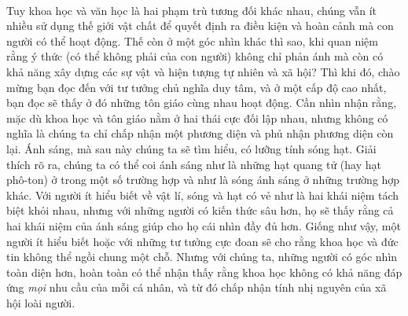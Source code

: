 \

Tuy khoa học và văn học là hai phạm trù tương đối khác nhau, chúng vẫn ít nhiều sử dụng thế giới vật chất để quyết định ra điều kiện và hoàn cảnh mà con người có thể hoạt động. Thế còn ở một góc nhìn khác thì sao, khi quan niệm rằng ý thức (có thể không phải của con người) không chỉ phản ánh mà còn có khả năng xây dựng các sự vật và hiện tượng tự nhiên và xã hội? Thì khi đó, chào mừng bạn đọc đến với tư tưởng chủ nghĩa duy tâm, và ở một cấp độ cao nhất, bạn đọc sẽ thấy ở đó những tôn giáo cùng nhau hoạt động. Cần nhìn nhận rằng, mặc dù khoa học và tôn giáo nằm ở hai thái cực đối lập nhau, nhưng không có nghĩa là chúng ta chỉ chấp nhận một phương diện và phủ nhận phương diện còn lại. Ánh sáng, mà sau này chúng ta sẽ tìm hiểu, có lưỡng tính sóng hạt. Giải thích rõ ra, chúng ta có thể coi ánh sáng như là những hạt quang tử (hay hạt phô-ton) ở trong một số trường hợp và như là sóng ánh sáng ở những trường hợp khác. Với người ít hiểu biết về vật lí, sóng và hạt có vẻ như là hai khái niệm tách biệt khỏi nhau, nhưng với những người có kiến thức sâu hơn, họ sẽ thấy rằng cả hai khái niệm của ánh sáng giúp cho họ cái nhìn đầy đủ hơn. Giống như vậy, một người ít hiểu biết hoặc với những tư tưởng cực đoan sẽ cho rằng khoa học và đức tin không thể ngồi chung một chỗ. Nhưng với chúng ta, những người có góc nhìn toàn diện hơn, hoàn toàn có thể nhận thấy rằng khoa học không có khả năng đáp ứng \emph{mọi} nhu cầu của mỗi cá nhân, và từ đó chấp nhận tính nhị nguyên của xã hội loài người.